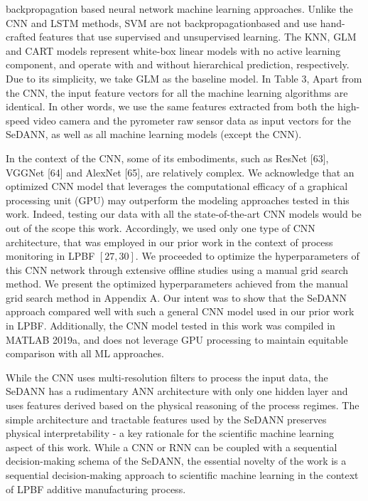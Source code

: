 \documentclass[10pt]{article}
\begin{document}
backpropagation based neural network machine learning approaches. Unlike the CNN and LSTM methods, SVM are not backpropagationbased and use hand-crafted features that use supervised and unsupervised learning. The KNN, GLM and CART models represent white-box linear models with no active learning component, and operate with and without hierarchical prediction, respectively. Due to its simplicity, we take GLM as the baseline model. In Table 3, Apart from the CNN, the input feature vectors for all the machine learning algorithms are identical. In other words, we use the same features extracted from both the high-speed video camera and the pyrometer raw sensor data as input vectors for the SeDANN, as well as all machine learning models (except the CNN).

In the context of the CNN, some of its embodiments, such as ResNet [63], VGGNet [64] and AlexNet [65], are relatively complex. We acknowledge that an optimized CNN model that leverages the computational efficacy of a graphical processing unit (GPU) may outperform the modeling approaches tested in this work. Indeed, testing our data with all the state-of-the-art CNN models would be out of the scope this work. Accordingly, we used only one type of CNN architecture, that was employed in our prior work in the context of process monitoring in LPBF $[27,30]$. We proceeded to optimize the hyperparameters of this CNN network through extensive offline studies using a manual grid search method. We present the optimized hyperparameters achieved from the manual grid search method in Appendix A. Our intent was to show that the SeDANN approach compared well with such a general CNN model used in our prior work in LPBF. Additionally, the CNN model tested in this work was compiled in MATLAB 2019a, and does not leverage GPU processing to maintain equitable comparison with all ML approaches.

While the CNN uses multi-resolution filters to process the input data, the SeDANN has a rudimentary ANN architecture with only one hidden layer and uses features derived based on the physical reasoning of the process regimes. The simple architecture and tractable features used by the SeDANN preserves physical interpretability - a key rationale for the scientific machine learning aspect of this work. While a CNN or RNN can be coupled with a sequential decision-making schema of the SeDANN, the essential novelty of the work is a sequential decision-making approach to scientific machine learning in the context of LPBF additive manufacturing process.
\end{document}

